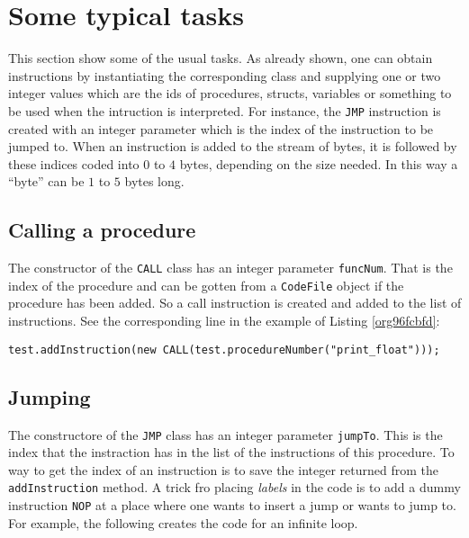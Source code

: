 \documentclass[11pt]{article}
\begin{document}
\section{Some typical tasks}
\label{sec:org6d2026e}
\label{org39ea8cd}


This section show some of the usual tasks. As already shown, one can obtain
instructions by instantiating the corresponding class and supplying one or
two integer values which are the ids of procedures, structs, variables or
something to be used when the intruction is interpreted. For instance, the
\texttt{JMP} instruction is created with an integer parameter which is the index
of the instruction to be jumped to.  When an instruction is added to the
stream of bytes, it is followed by these indices coded into \(0\) to \(4\)
bytes, depending on the size needed. In this way a ``byte'' can be \(1\) to
\(5\) bytes long.


\subsection{Calling a procedure}
\label{sec:org664dc5e}

The constructor of the \texttt{CALL} class has an integer parameter
\texttt{funcNum}. That is the index of the procedure and can be gotten from a
\texttt{CodeFile} object if the procedure has been added. So a call instruction is
created and added to the list of instructions. See the corresponding line
in the example of Listing \ref{org96fcbfd}:

\lstset{language=java,label=orge905268,caption= ,captionpos=b,numbers=none,firstline=15, lastline=16}
\begin{lstlisting}
test.addInstruction(new CALL(test.procedureNumber("print_float")));
\end{lstlisting}



\subsection{Jumping}
\label{sec:org5614f8e}
\label{org8399359}

The constructore of the \texttt{JMP} class has an integer parameter \texttt{jumpTo}. This
is the index that the instraction has in the list of the instructions of
this procedure. To way to get the index of an instruction is to save the
integer returned from the \texttt{addInstruction} method. A trick fro placing
\emph{labels} in the code is to add a dummy instruction \texttt{NOP} at a place where
one wants to insert a jump or wants to jump to. For example, the following
creates the code for an infinite loop.
\end{document}
